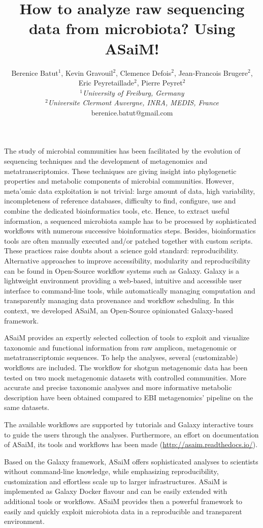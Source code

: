 \documentclass[english]{gcb17abstract}
\title{How to analyze raw sequencing data from microbiota? Using ASaiM!}
\author{Berenice Batut$^{1}$, Kevin Gravouil$^{2}$, Clemence Defois$^{2}$, Jean-Francois Brugere$^{2}$, Eric Peyretaillade$^{2}$, Pierre Peyret$^{2}$\\
{\normalsize\normalfont\itshape $^{1}$University of Freiburg, Germany\\
$^{2}$Universite Clermont Auvergne, INRA, MEDIS, France\\}
berenice.batut@gmail.com
}
\begin{document}
\maketitle 

The study of microbial communities has been facilitated by the evolution of sequencing techniques and the development of metagenomics and metatranscriptomics. These techniques are giving insight into phylogenetic properties and metabolic components of microbial communities. However, meta'omic data exploitation is not trivial: large amount of data, high variability, incompleteness of reference databases, difficulty to find, configure, use and combine the dedicated bioinformatics tools, etc. Hence, to extract useful information, a sequenced microbiota sample has to be processed by sophisticated workflows with numerous successive bioinformatics steps. Besides, bioinformatics tools are often manually executed and/or patched together with custom scripts. These practices raise doubts about a science gold standard: reproducibility. Alternative approaches to improve accessibility, modularity and reproducibility can be found in Open-Source workflow systems such as Galaxy. Galaxy is a lightweight environment providing a web-based, intuitive and accessible user interface to command-line tools, while automatically managing computation and transparently managing data provenance and workflow scheduling. In this context, we developed ASaiM, an Open-Source opinionated Galaxy-based framework.

ASaiM provides an expertly selected collection of tools to exploit and visualize taxonomic and functional information from raw amplicon, metagenomic or metatranscriptomic sequences. To help the analyses, several (customizable) workflows are included. The workflow for shotgun metagenomic data has been tested on two mock metagenomic datasets with controlled communities. More accurate and precise taxonomic analyses and more informative metabolic description have been obtained compared to EBI metagenomics' pipeline on the same datasets.

The available workflows are supported by tutorials and Galaxy interactive tours to guide the users through the analyses. Furthermore, an effort on documentation of ASaiM, its tools and workflows has been made (\href{http://asaim.readthedocs.io/}{http://asaim.readthedocs.io/}).

Based on the Galaxy framework, ASaiM offers sophisticated analyses to scientists without command-line knowledge, while emphasizing reproducibility, customization and effortless scale up to larger infrastructures. ASaiM is implemented as Galaxy Docker flavour and can be easily extended with additional tools or workflows. ASaiM provides then a powerful framework to easily and quickly exploit microbiota data in a reproducible and transparent environment.


\end{document}
